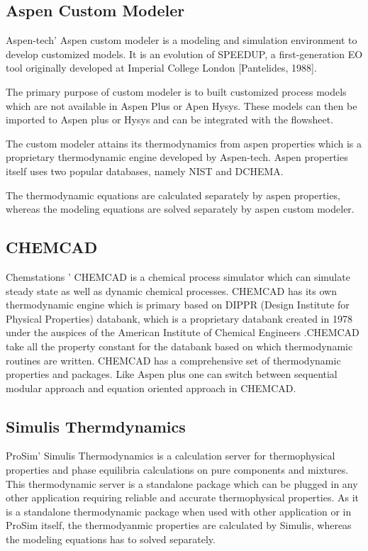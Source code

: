 \documentclass[12pt]{report}
\begin{document}
\subsection{Aspen Custom Modeler}
Aspen-tech' Aspen custom modeler is a modeling and simulation environment to develop customized models. It is an evolution of SPEEDUP, a first-generation EO
tool originally developed at Imperial College London [Pantelides, 1988].

The primary purpose of custom modeler is to built customized process models which are not available in Aspen Plus or Apen Hysys. These models can then be imported to Aspen plus or Hysys and can be integrated with the flowsheet. 

The custom modeler attains its thermodynamics from aspen properties which is a proprietary thermodynamic engine developed by Aspen-tech. Aspen properties itself uses two popular databases, namely NIST and DCHEMA.

The thermodynamic equations are calculated separately by aspen properties, whereas the modeling equations are solved separately by aspen custom modeler. \cite{ACM}

\subsection{CHEMCAD}
Chemstations ' CHEMCAD \cite{Chemcad}  is a chemical process simulator which can simulate steady state as well as dynamic chemical processes. CHEMCAD has its own thermodynamic engine which is primary based on DIPPR (Design Institute for Physical Properties) databank, which is a proprietary databank created in 1978 under the auspices of the American Institute of Chemical Engineers \cite{DIPPR}.CHEMCAD take all the property constant for the databank based on which thermodynamic routines are written. CHEMCAD has a comprehensive set of thermodynamic properties and packages. Like Aspen plus one can switch between sequential modular approach and equation oriented approach in CHEMCAD.
 
\subsection{Simulis Thermdynamics}
ProSim' Simulis Thermodynamics \cite{Simulis} is a calculation server for thermophysical properties and phase equilibria calculations on pure components and mixtures. This thermodynamic server is a standalone package which can be plugged in any other application requiring reliable and accurate thermophysical properties. As it is a standalone thermodynamic package when used with other application or in ProSim itself, the thermodyanmic properties are calculated by Simulis, whereas the modeling equations has to solved separately.  
\end{document}
